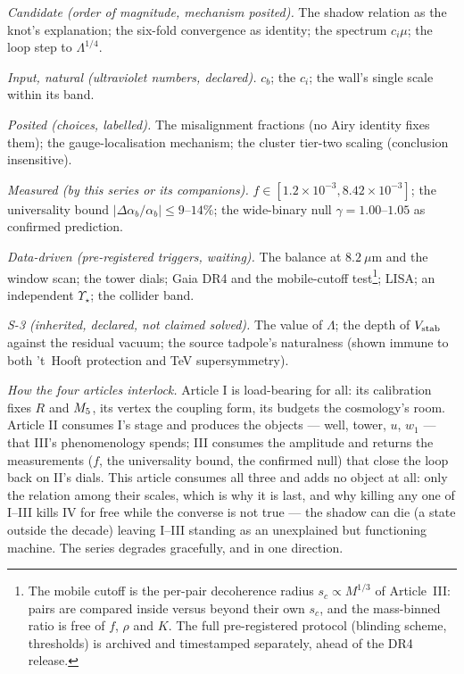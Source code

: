 \emph{Candidate (order of magnitude, mechanism posited).} The shadow relation as the knot's explanation; the six-fold convergence as identity; the spectrum $c_{i}\mu$; the loop step to $\Lambda^{1/4}$.

\emph{Input, natural (ultraviolet numbers, declared).} $c_{b}$; the $c_{i}$; the wall's single scale within its band.

\emph{Posited (choices, labelled).} The misalignment fractions (no Airy identity fixes them); the gauge-localisation mechanism; the cluster tier-two scaling (conclusion insensitive).

\emph{Measured (by this series or its companions).} $f\in[1.2\times10^{-3},8.42\times10^{-3}]$; the universality bound $|\Delta\alpha_{b}/\alpha_{b}|\leq9$--$14\%$; the wide-binary null $\gamma=1.00$--$1.05$ as confirmed prediction.

\emph{Data-driven (pre-registered triggers, waiting).} The balance at $8.2~\mu$m and the window scan; the tower dials; Gaia DR4 and the mobile-cutoff test\footnote{The mobile cutoff is the per-pair decoherence radius $s_{c}\propto M^{1/3}$ of Article~III: pairs are compared inside versus beyond their own $s_{c}$, and the mass-binned ratio is free of $f$, $\rho$ and $K$. The full pre-registered protocol (blinding scheme, thresholds) is archived and timestamped separately, ahead of the DR4 release.}; LISA; an independent $\Upsilon_{\star}$; the collider band.

\emph{S-3 (inherited, declared, not claimed solved).} The value of $\Lambda$; the depth of $V_{\rm stab}$ against the residual vacuum; the source tadpole's naturalness (shown immune to both 't~Hooft protection and TeV supersymmetry).

\emph{How the four articles interlock.} Article I is load-bearing for all: its calibration fixes $R$ and $M_5$, its vertex the coupling form, its budgets the cosmology's room. Article II consumes I's stage and produces the objects --- well, tower, $u$, $w_{1}$ --- that III's phenomenology spends; III consumes the amplitude and returns the measurements ($f$, the universality bound, the confirmed null) that close the loop back on II's dials. This article consumes all three and adds no object at all: only the relation among their scales, which is why it is last, and why killing any one of I--III kills IV for free while the converse is not true --- the shadow can die (a state outside the decade) leaving I--III standing as an unexplained but functioning machine. The series degrades gracefully, and in one direction.

